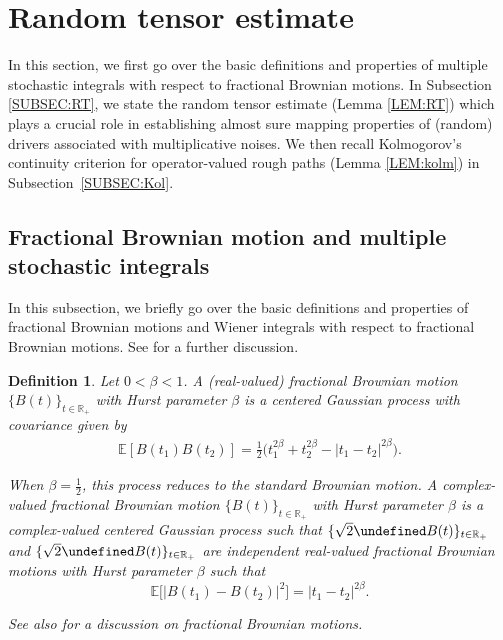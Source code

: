 \documentclass[letterpaper, 11pt,  reqno]{amsart}
\newtheorem{definition}[theorem]{Definition}
\newcommand{\1}{\hspace{0.5mm}\textup{I}\hspace{0.5mm}}
\newcommand{\noi}{\noindent}
\newcommand{\R}{\mathbb{R}}
\let\Re=\undefined\DeclareMathOperator*{\Re}{Re}
\let\Im=\undefined\DeclareMathOperator*{\Im}{Im}
\newcommand{\E}{\mathbb{E}}
\newcommand{\be}{\beta}
\numberwithin{equation}{section}
\numberwithin{theorem}{section}
\begin{document}
\section{Random tensor estimate}
\label{SEC:RT}


In this section, 
 we first go over the basic definitions and properties of multiple stochastic integrals
 with respect to fractional Brownian motions.
In Subsection \ref{SUBSEC:RT},  
we state the random tensor estimate (Lemma \ref{LEM:RT})
which plays a crucial role
in establishing almost sure mapping properties
of (random) drivers
associated with multiplicative noises.
We then recall 
Kolmogorov's continuity criterion
for operator-valued rough paths
(Lemma \ref{LEM:kolm})
in Subsection~\ref{SUBSEC:Kol}.

\subsection{Fractional Brownian motion and multiple stochastic integrals}
\label{SUBSEC:FBM}





In this subsection, we 
briefly go over 
 the basic definitions and properties  of fractional Brownian motions and 
Wiener integrals with  respect to fractional Brownian motions.
See \cite[Chapter 5]{Nualart06} for a further discussion.

\begin{definition}\rm
\label{DEF:fBM}
Let $0 < \be < 1$.
 A (real-valued) fractional Brownian motion $\{B(t)\}_{t\in \R_+}$ with Hurst parameter $\be$ is a centered Gaussian process with covariance given by
\begin{align*}
 \E[B(t_1) B(t_2)] =   \frac12 \Big( t_1^{2\be} + t_2^{2\be} - |t_1-t_2|^{2\be}\Big) .
\end{align*}


\noi
When $\be=\frac12$, this process reduces  to the standard Brownian motion. 
A complex-valued fractional Brownian motion $\{ B(t)\}_{t\in \R_+}$ with Hurst parameter $\be$ is a 
complex-valued centered Gaussian process  such that 
$\{ \sqrt 2 \Re B(t)\}_{t\in \R_+}$ and  $\{\sqrt 2\Im B(t)\}_{t\in \R_+}$
 are independent real-valued fractional Brownian motions with Hurst parameter $\be$
 such that 
 \[ \E\big[ |B(t_1) - B(t_2)|^2\big] = |t_1 - t_2|^{2\be}.\]

\noi
See also 
\cite[Section 5]{OST}
for a discussion on fractional Brownian motions.




\end{definition}
\end{document}
